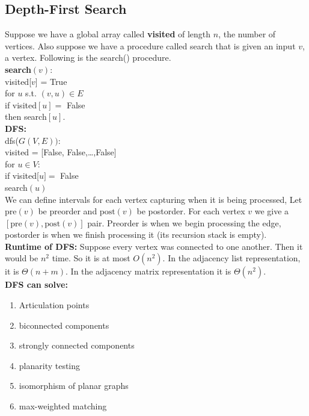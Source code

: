 \documentclass[12pt]{article}   	%
\begin{document}
\subsection{Depth-First Search}
Suppose we have a global array called {\bf visited} of length $n$, the number of vertices. Also suppose we have a procedure called search that is given an input $v$, a vertex. Following is the search() procedure.\\

\noindent
{\bf search}$(v)$:\\
\indent
visited[$v$] = True\\
\indent
for $u$ s.t. $(v,u) \in E$\\
\indent
\indent
if visited$[u] =$ False\\
\indent
\indent
\indent
then search$[u]$.\\

\noindent
{\bf DFS: }\\
dfs($G(V,E))$:\\
\indent
visited =  [False, False,\ldots,False]\\
\indent
for $u \in V$:\\
\indent
\indent
if visited[$u] =$ False\\
\indent
\indent
\indent
search$(u)$\\

\noindent
We can define intervals for each vertex capturing when it is being processed, Let $\text{pre}(v)$ be preorder and $\text{post}(v)$ be postorder. For each vertex $v$ we give a $[\text{pre}(v),\text{post}(v)]$ pair. Preorder is when we begin processing the edge, postorder is when we finish processing it (its recursion stack is empty).\\

\noindent
{\bf Runtime of DFS: } Suppose every vertex was connected to one another. Then it would be $n^2$ time. So it is at most $O(n^2)$. In the adjacency list representation, it is $\Theta(n+m)$. In the adjacency matrix representation it is $\Theta(n^2)$.\\

\noindent
{\bf DFS can solve: }
\begin{enumerate}
\item Articulation points
\item biconnected components
\item strongly connected components
\item planarity testing
\item isomorphism of planar graphs
\item max-weighted matching
\end{enumerate}
\end{document}
